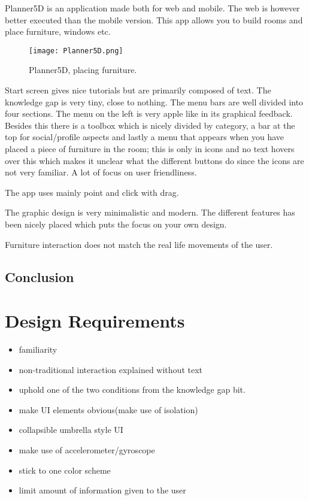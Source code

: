 Planner5D is an application made both for web and mobile. The web is however better executed than the mobile version. This app allows you to build rooms and place furniture, windows etc. 

\begin{figure}[H]
\centering
\texttt{[image: Planner5D.png]}
\caption{Planner5D, placing furniture.}
\end{figure}

Start screen gives nice tutorials but are primarily composed of text. The knowledge gap is very tiny, close to nothing.
The menu bars are well divided into four sections.
The menu on the left is very apple like in its graphical feedback. Besides this there is a toolbox which is nicely divided by category, a bar at the top for social/profile aspects and lastly a menu that appears when you have placed a piece of furniture in the room; this is only in icons and no text hovers over this which makes it unclear what the different buttons do since the icons are not very familiar. A lot of focus on user friendliness. 

The app uses mainly point and click with drag.

The graphic design is very minimalistic and modern. The different features has been nicely placed which puts the focus on your own design. 

Furniture interaction does not match the real life movements of the user.

\subsection{Conclusion}



\section{Design Requirements}

\begin{itemize}
\item familiarity
\item non-traditional interaction explained without text
\item uphold one of the two conditions from the knowledge gap bit. 
\item make UI elements obvious(make use of isolation)
\item collapsible umbrella style UI
\item make use of accelerometer/gyroscope
\item stick to one color scheme
\item limit amount of information given to the user
\end{itemize}

